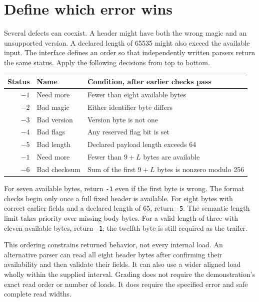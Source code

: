 \section{Define which error wins}
Several defects can coexist. A header might have both the wrong magic and an
unsupported version. A declared length of 65535 might also exceed the available
input. The interface defines an order so that independently written parsers return
the same status. Apply the following decisions from top to bottom.

\begin{longtable}{rlp{91mm}}
  \toprule Status & Name         & Condition, after earlier checks pass                 \\\midrule
  \(-1\)          & Need more    & Fewer than eight available bytes                     \\
  \(-2\)          & Bad magic    & Either identifier byte differs                       \\
  \(-3\)          & Bad version  & Version byte is not one                              \\
  \(-4\)          & Bad flags    & Any reserved flag bit is set                         \\
  \(-5\)          & Bad length   & Declared payload length exceeds 64                   \\
  \(-1\)          & Need more    & Fewer than \(9+L\) bytes are available               \\
  \(-6\)          & Bad checksum & Sum of the first \(9+L\) bytes is nonzero modulo 256 \\
  \bottomrule
\end{longtable}
For seven available bytes, return \texttt{-1} even if the first byte is wrong.
The format checks begin only once a full fixed header is available. For eight
bytes with correct earlier fields and a declared length of 65, return \texttt{-5}.
The semantic length limit takes priority over missing body bytes. For a valid
length of three with eleven available bytes, return \texttt{-1}; the twelfth byte
is still required as the trailer.

This ordering constrains returned behavior, not every internal load. An alternative
parser can read all eight header bytes after confirming their availability and then
validate their fields. It can also use a wider aligned load wholly within the
supplied interval. Grading does not require the demonstration's exact read order or
number of loads. It does require the specified error and safe complete read widths.
